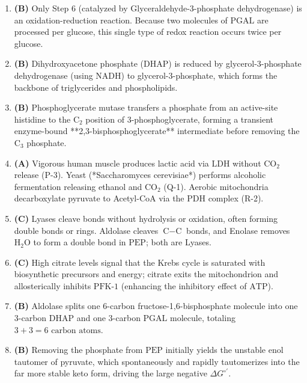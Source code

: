 \documentclass[11pt, a4paper]{article}
\begin{document}
\begin{enumerate}[label=\textbf{\arabic*.}]
\item \textbf{(B)} Only Step 6 (catalyzed by Glyceraldehyde-3-phosphate dehydrogenase) is an oxidation-reduction reaction. Because two molecules of $\text{PGAL}$ are processed per glucose, this single type of redox reaction occurs twice per glucose.

\item \textbf{(B)} Dihydroxyacetone phosphate ($\text{DHAP}$) is reduced by glycerol-3-phosphate dehydrogenase (using $\text{NADH}$) to glycerol-3-phosphate, which forms the backbone of triglycerides and phospholipids.

\item \textbf{(B)} Phosphoglycerate mutase transfers a phosphate from an active-site histidine to the $\text{C}_2$ position of 3-phosphoglycerate, forming a transient enzyme-bound **2,3-bisphosphoglycerate** intermediate before removing the $\text{C}_3$ phosphate.

\item \textbf{(A)} Vigorous human muscle produces lactic acid via $\text{LDH}$ without $\text{CO}_2$ release (P-3). Yeast (*Saccharomyces cerevisiae*) performs alcoholic fermentation releasing ethanol and $\text{CO}_2$ (Q-1). Aerobic mitochondria decarboxylate pyruvate to Acetyl-CoA via the $\text{PDH}$ complex (R-2).

\item \textbf{(C)} Lyases cleave bonds without hydrolysis or oxidation, often forming double bonds or rings. Aldolase cleaves $\text{C}-\text{C}$ bonds, and Enolase removes $\text{H}_2\text{O}$ to form a double bond in $\text{PEP}$; both are Lyases.

\item \textbf{(C)} High citrate levels signal that the Krebs cycle is saturated with biosynthetic precursors and energy; citrate exits the mitochondrion and allosterically inhibits $\text{PFK-1}$ (enhancing the inhibitory effect of $\text{ATP}$).

\item \textbf{(B)} Aldolase splits one 6-carbon fructose-1,6-bisphosphate molecule into one 3-carbon $\text{DHAP}$ and one 3-carbon $\text{PGAL}$ molecule, totaling $3 + 3 = 6\text{ carbon atoms}$.

\item \textbf{(B)} Removing the phosphate from $\text{PEP}$ initially yields the unstable enol tautomer of pyruvate, which spontaneously and rapidly tautomerizes into the far more stable keto form, driving the large negative $\Delta G^{\circ\prime}$.


\end{enumerate}
\end{document}
